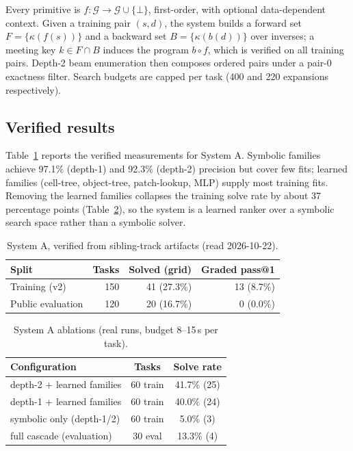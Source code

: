 \documentclass[11pt,a4paper]{article}
\begin{document}
Every primitive is $f:\mathcal{G}\to\mathcal{G}\cup\{\bot\}$, first-order, with optional data-dependent context. Given a training pair $(s,d)$, the system builds a forward set $F=\{\kappa(f(s))\}$ and a backward set $B=\{\kappa(b(d))\}$ over inverses; a meeting key $k \in F \cap B$ induces the program $b\circ f$, which is verified on all training pairs. Depth-2 beam enumeration then composes ordered pairs under a pair-0 exactness filter. Search budgets are capped per task (400 and 220 expansions respectively).

\subsection{Verified results}

Table~\ref{tab:systemA} reports the verified measurements for System A. Symbolic families achieve 97.1\% (depth-1) and 92.3\% (depth-2) precision but cover few fits; learned families (cell-tree, object-tree, patch-lookup, MLP) supply most training fits. Removing the learned families collapses the training solve rate by about 37 percentage points (Table~\ref{tab:ablation}), so the system is a learned ranker over a symbolic search space rather than a symbolic solver.

\begin{table}[h]
\centering
\caption{System A, verified from sibling-track artifacts (read 2026-10-22).}
\label{tab:systemA}
\begin{tabular}{lrrr}
\toprule
Split & Tasks & Solved (grid) & Graded pass@1 \\
\midrule
Training (v2) & 150 & 41 (27.3\%) & 13 (8.7\%) \\
Public evaluation & 120 & 20 (16.7\%) & 0 (0.0\%) \\
\bottomrule
\end{tabular}
\end{table}

\begin{table}[h]
\centering
\caption{System A ablations (real runs, budget 8--15\,s per task).}
\label{tab:ablation}
\begin{tabular}{lcc}
\toprule
Configuration & Tasks & Solve rate \\
\midrule
depth-2 + learned families & 60 train & 41.7\% (25) \\
depth-1 + learned families & 60 train & 40.0\% (24) \\
symbolic only (depth-1/2) & 60 train & 5.0\% (3) \\
full cascade (evaluation) & 30 eval & 13.3\% (4) \\
\bottomrule
\end{tabular}
\end{table}
\end{document}
